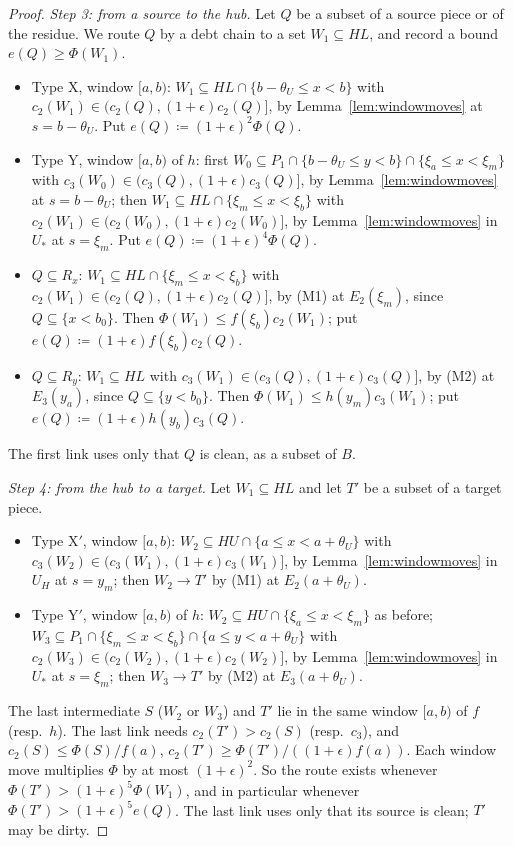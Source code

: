 \documentclass[11pt]{article}
\theoremstyle{definition}\newtheorem{definition}[theorem]{Definition}
\theoremstyle{remark}\newtheorem{remark}[theorem]{Remark}
\begin{document}
\begin{proof}
\emph{Step 3: from a source to the hub.} Let $Q$ be a subset of a source
piece or of the residue. We route $Q$ by a debt chain to a set
$W_1\subseteq HL$, and record a bound $e(Q)\ge\Phi(W_1)$.
\begin{itemize}[leftmargin=*,itemsep=2pt]
\item Type X, window $[a,b)$: $W_1\subseteq HL\cap\{b-\theta_U\le x<b\}$
with $c_2(W_1)\in(c_2(Q),(1+\epsilon)c_2(Q)]$, by Lemma~\ref{lem:windowmoves}
at $s=b-\theta_U$. Put $e(Q)\coloneqq(1+\epsilon)^2\Phi(Q)$.
\item Type Y, window $[a,b)$ of $h$: first $W_0\subseteq P_1\cap\{b-\theta_U\le
y<b\}\cap\{\xi_a\le x<\xi_m\}$ with $c_3(W_0)\in(c_3(Q),(1+\epsilon)c_3(Q)]$,
by Lemma~\ref{lem:windowmoves} at $s=b-\theta_U$; then $W_1\subseteq
HL\cap\{\xi_m\le x<\xi_b\}$ with $c_2(W_1)\in(c_2(W_0),(1+\epsilon)c_2(W_0)]$,
by Lemma~\ref{lem:windowmoves} in $U_*$ at $s=\xi_m$. Put
$e(Q)\coloneqq(1+\epsilon)^4\Phi(Q)$.
\item $Q\subseteq R_x$: $W_1\subseteq HL\cap\{\xi_m\le x<\xi_b\}$ with
$c_2(W_1)\in(c_2(Q),(1+\epsilon)c_2(Q)]$, by (M1) at $E_2(\xi_m)$, since
$Q\subseteq\{x<b_0\}$. Then $\Phi(W_1)\le f(\xi_b)c_2(W_1)$; put
$e(Q)\coloneqq(1+\epsilon)f(\xi_b)c_2(Q)$.
\item $Q\subseteq R_y$: $W_1\subseteq HL$ with
$c_3(W_1)\in(c_3(Q),(1+\epsilon)c_3(Q)]$, by (M2) at $E_3(y_a)$, since
$Q\subseteq\{y<b_0\}$. Then $\Phi(W_1)\le h(y_m)c_3(W_1)$; put
$e(Q)\coloneqq(1+\epsilon)h(y_b)c_3(Q)$.
\end{itemize}
The first link uses only that $Q$ is clean, as a subset of $B$.

\emph{Step 4: from the hub to a target.} Let $W_1\subseteq HL$ and let $T'$
be a subset of a target piece.
\begin{itemize}[leftmargin=*,itemsep=2pt]
\item Type X$'$, window $[a,b)$: $W_2\subseteq HU\cap\{a\le x<a+\theta_U\}$
with $c_3(W_2)\in(c_3(W_1),(1+\epsilon)c_3(W_1)]$, by
Lemma~\ref{lem:windowmoves} in $U_H$ at $s=y_m$; then $W_2\to T'$ by (M1) at
$E_2(a+\theta_U)$.
\item Type Y$'$, window $[a,b)$ of $h$: $W_2\subseteq HU\cap\{\xi_a\le
x<\xi_m\}$ as before; $W_3\subseteq P_1\cap\{\xi_m\le x<\xi_b\}\cap\{a\le
y<a+\theta_U\}$ with $c_2(W_3)\in(c_2(W_2),(1+\epsilon)c_2(W_2)]$, by
Lemma~\ref{lem:windowmoves} in $U_*$ at $s=\xi_m$; then $W_3\to T'$ by (M2) at
$E_3(a+\theta_U)$.
\end{itemize}
The last intermediate $S$ ($W_2$ or $W_3$) and $T'$ lie in the same window
$[a,b)$ of $f$ (resp.\ $h$). The last link needs $c_2(T')>c_2(S)$ (resp.\
$c_3$), and $c_2(S)\le\Phi(S)/f(a)$, $c_2(T')\ge\Phi(T')/((1+\epsilon)f(a))$.
Each window move multiplies $\Phi$ by at most $(1+\epsilon)^2$. So the route
exists whenever $\Phi(T')>(1+\epsilon)^5\Phi(W_1)$, and in particular
whenever $\Phi(T')>(1+\epsilon)^5e(Q)$. The last link uses only that its
source is clean; $T'$ may be dirty.


\end{proof}
\end{document}
